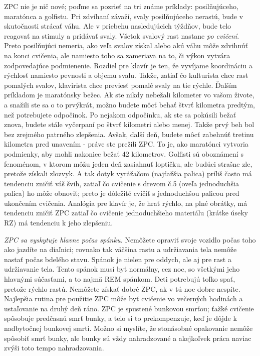 ZPC nie je nič nové; poďme sa pozrieť na tri známe príklady: posilňujúceho, maratónca a golfistu. Pri zdvíhaní závaží, svaly posilňujúceho nerastú, bude v skutočnosti strácať váhu. Ale v priebehu nasledujúcich týždňov, bude telo reagovať na stimuly a pridávať svaly. Všetok svalový rast nastane \textit{po cvičení}. Preto posilňujúci nemeria, ako veľa svalov získal alebo akú váhu môže zdvihnúť na konci cvičenia, ale namiesto toho sa zameriava na to, či výkon vytvára zodpovedajúce podmienenie. Rozdiel pre klavír je ten, že vyvíjame koordináciu a rýchlosť namiesto pevnosti a objemu svalu. Takže, zatiaľ čo kulturista chce rast pomalých svalov, klavirista chce previesť pomalé svaly na tie rýchle. Ďalším príkladom je maratónsky bežec. Ak ste nikdy nebežali kilometer vo vašom živote, a snažili ste sa o to prvýkrát, možno budete môcť behať štvrť kilometra predtým, než potrebujete odpočinok. Po nejakom odpočinku, ak ste sa pokúsili bežať znova, budete stále vyčerpaní po štvrť kilometri alebo menej. Takže prvý beh bol bez zrejmého patrného zlepšenia. Avšak, ďalší deň, budete môcť zabehnúť tretinu kilometra pred unavením - práve ste prežili ZPC. To je, ako maratónci vytvoria podmienky, aby mohli nakoniec bežať 42 kilometrov. Golfisti sú oboznámení s fenoménom, v ktorom môžu jeden deň zasiahnuť loptičku, ale budúci strašne zle, pretože získali zlozvyk. A tak dotyk vyrážačom (najťažšia palica) príliš často má tendenciu zničiť váš švih, zatiaľ čo cvičenie s drevom č.5 (oveľa jednoduchšia palica) ho môže obnoviť; preto je dôležité cvičiť s jednoduchšou palicou pred ukončením cvičenia. Analógia pre klavír je, že hrať rýchlo, na plné obrátky, má tendenciu zničiť ZPC zatiaľ čo cvičenie jednoduchšieho materiálu (krátke úseky RZ) má tendenciu k jeho zlepšeniu.

\emph{ZPC sa vyskytuje hlavne počas spánku.} Nemôžete opraviť svoje vozidlo počas toho ako jazdíte na diaľnici; rovnako tak väčšina rastu a udržiavania tela nemôže nastať počas bdelého stavu. Spánok je nielen pre oddych, ale aj pre rast a udržiavanie tela. Tento spánok musí byť normálny, cez noc, so všetkými jeho hlavnými súčasťami, a to najmä REM spánkom. Deti potrebujú toľko spať, pretože rýchlo rastú. Nemôžete získať dobré ZPC, ak v tú noc dobre nespíte. Najlepšia rutina pre použitie ZPC môže byť cvičenie vo večerných hodinách a ustaľovanie na druhý deň ráno. ZPC je spustené bunkovou smrťou; ťažké cvičenie spôsobuje predčasnú smrť bunky, a telo si to prekompenzuje, keď je dôjde k nadbytočnej   bunkovej smrti. Možno si myslíte, že stonásobné opakovanie nemôže spôsobiť smrť bunky, ale bunky sú vždy nahradzované a akejkoľvek práca naviac zvýši toto tempo nahradzovania.

